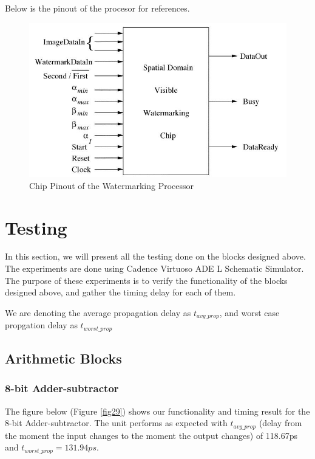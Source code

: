 \documentclass[letterpaper, 11pt]{article}
\begin{document}
	Below is the pinout of the procesor for references.
	
	\begin{figure}[htb!]
		\centering
		\includegraphics[width=0.85\linewidth]{report_pics/processor_block_diag.jpg}
		\caption{Chip Pinout of the Watermarking Processor}
		\label{fig28}
	\end{figure}
	
	
	\newpage
	
	\section{Testing}
	\label{sec:testing}
	
	In this section, we will present all the testing done on the blocks designed above. The experiments are done using Cadence Virtuoso ADE L Schematic Simulator. The purpose of these experiments is to verify the functionality of the blocks designed above, and gather the timing delay for each of them.
	
	We are denoting the average propagation delay as $t_{avg\_prop}$, and worst case propgation delay as $t_{worst\_prop}$
	
	\subsection{Arithmetic Blocks}
	\label{subsec:arith_blocks}
	
	\subsubsection{8-bit Adder-subtractor}
	
	The figure below (Figure \ref{fig29}) shows our functionality and timing result for the 8-bit Adder-subtractor. The unit performs as expected with $t_{avg\_prop}$ (delay from the moment the input changes to the moment the output changes) of 118.67ps and $t_{worst\_prop} = 131.94ps$.
	
\end{document}
